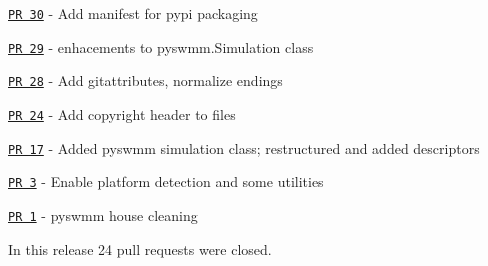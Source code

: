 \begin{DoxyItemize}
\item \href{https://github.com/OpenWaterAnalytics/pyswmm/pull/30}{\tt PR 30} -\/ Add manifest for pypi packaging
\item \href{https://github.com/OpenWaterAnalytics/pyswmm/pull/29}{\tt PR 29} -\/ enhacements to pyswmm.\+Simulation class
\item \href{https://github.com/OpenWaterAnalytics/pyswmm/pull/28}{\tt PR 28} -\/ Add gitattributes, normalize endings
\item \href{https://github.com/OpenWaterAnalytics/pyswmm/pull/24}{\tt PR 24} -\/ Add copyright header to files
\item \href{https://github.com/OpenWaterAnalytics/pyswmm/pull/17}{\tt PR 17} -\/ Added pyswmm simulation class; restructured and added descriptors
\item \href{https://github.com/OpenWaterAnalytics/pyswmm/pull/3}{\tt PR 3} -\/ Enable platform detection and some utilities
\item \href{https://github.com/OpenWaterAnalytics/pyswmm/pull/1}{\tt PR 1} -\/ pyswmm house cleaning
\end{DoxyItemize}

In this release 24 pull requests were closed. 